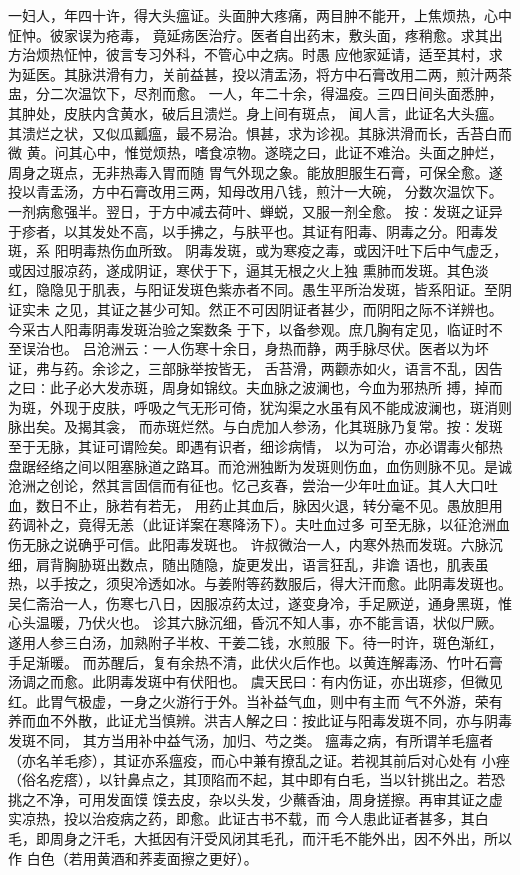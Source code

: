 \documentclass[a4paper,12pt,UTF8,twoside]{ctexbook}
\begin{document}
一妇人，年四十许，得大头瘟证。头面肿大疼痛，两目肿不能开，上焦烦热，心中怔忡。彼家误为疮毒， 
竟延疡医治疗。医者自出药末，敷头面，疼稍愈。求其出方治烦热怔忡，彼言专习外科，不管心中之病。时愚 
应他家延请，适至其村，求为延医。其脉洪滑有力，关前益甚，投以清盂汤，将方中石膏改用二两，煎汁两茶 
盅，分二次温饮下，尽剂而愈。 
一人，年二十余，得温疫。三四日间头面悉肿，其肿处，皮肤内含黄水，破后且溃烂。身上间有斑点， 
闻人言，此证名大头瘟。其溃烂之状，又似瓜瓤瘟，最不易治。惧甚，求为诊视。其脉洪滑而长，舌苔白而微 
黄。问其心中，惟觉烦热，嗜食凉物。遂晓之曰，此证不难治。头面之肿烂，周身之斑点，无非热毒入胃而随 
胃气外现之象。能放胆服生石膏，可保全愈。遂投以青盂汤，方中石膏改用三两，知母改用八钱，煎汁一大碗， 
分数次温饮下。一剂病愈强半。翌日，于方中减去荷叶、蝉蜕，又服一剂全愈。 
按∶发斑之证异于疹者，以其发处不高，以手拂之，与肤平也。其证有阳毒、阴毒之分。阳毒发斑，系 
阳明毒热伤血所致。 
阴毒发斑，或为寒疫之毒，或因汗吐下后中气虚乏，或因过服凉药，遂成阴证，寒伏于下，逼其无根之火上独 
熏肺而发斑。其色淡红，隐隐见于肌表，与阳证发斑色紫赤者不同。愚生平所治发斑，皆系阳证。至阴证实未 
之见，其证之甚少可知。然正不可因阴证者甚少，而阴阳之际不详辨也。今采古人阳毒阴毒发斑治验之案数条 
于下，以备参观。庶几胸有定见，临证时不至误治也。 
吕沧洲云∶一人伤寒十余日，身热而静，两手脉尽伏。医者以为坏证，弗与药。余诊之，三部脉举按皆无， 
舌苔滑，两颧赤如火，语言不乱，因告之曰∶此子必大发赤斑，周身如锦纹。夫血脉之波澜也，今血为邪热所 
搏，掉而为斑，外现于皮肤，呼吸之气无形可倚，犹沟渠之水虽有风不能成波澜也，斑消则脉出矣。及揭其衾， 
而赤斑烂然。与白虎加人参汤，化其斑脉乃复常。按∶发斑至于无脉，其证可谓险矣。即遇有识者，细诊病情， 
以为可治，亦必谓毒火郁热盘踞经络之间以阻塞脉道之路耳。而沧洲独断为发斑则伤血，血伤则脉不见。是诚 
沧洲之创论，然其言固信而有征也。忆己亥春，尝治一少年吐血证。其人大口吐血，数日不止，脉若有若无， 
用药止其血后，脉因火退，转分毫不见。愚放胆用药调补之，竟得无恙（此证详案在寒降汤下）。夫吐血过多 
可至无脉，以征沧洲血伤无脉之说确乎可信。此阳毒发斑也。 
许叔微治一人，内寒外热而发斑。六脉沉细，肩背胸胁斑出数点，随出随隐，旋更发出，语言狂乱，非谵 
语也，肌表虽热，以手按之，须臾冷透如冰。与姜附等药数服后，得大汗而愈。此阴毒发斑也。 
吴仁斋治一人，伤寒七八日，因服凉药太过，遂变身冷，手足厥逆，通身黑斑，惟心头温暖，乃伏火也。 
诊其六脉沉细，昏沉不知人事，亦不能言语，状似尸厥。遂用人参三白汤，加熟附子半枚、干姜二钱，水煎服 
下。待一时许，斑色渐红，手足渐暖。 
而苏醒后，复有余热不清，此伏火后作也。以黄连解毒汤、竹叶石膏汤调之而愈。此阴毒发斑中有伏阳也。 
虞天民曰∶有内伤证，亦出斑疹，但微见红。此胃气极虚，一身之火游行于外。当补益气血，则中有主而 
气不外游，荣有养而血不外散，此证尤当慎辨。洪吉人解之曰∶按此证与阳毒发斑不同，亦与阴毒发斑不同， 
其方当用补中益气汤，加归、芍之类。 
瘟毒之病，有所谓羊毛瘟者（亦名羊毛疹），其证亦系瘟疫，而心中兼有撩乱之证。若视其前后对心处有 
小痤（俗名疙瘩），以针鼻点之，其顶陷而不起，其中即有白毛，当以针挑出之。若恐挑之不净，可用发面馍 
馍去皮，杂以头发，少蘸香油，周身搓擦。再审其证之虚实凉热，投以治疫病之药，即愈。此证古书不载，而 
今人患此证者甚多，其白毛，即周身之汗毛，大抵因有汗受风闭其毛孔，而汗毛不能外出，因不外出，所以作 
白色（若用黄酒和荞麦面擦之更好）。 
\end{document}
